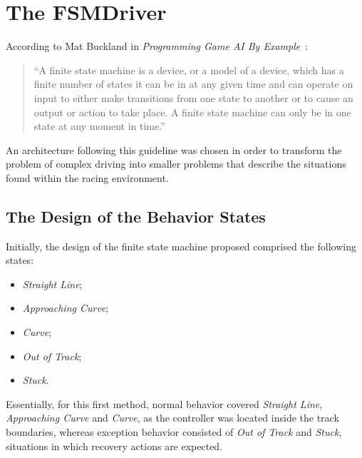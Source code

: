 \section{\textbf{The FSMDriver}} \label{sec:FSM}
	
	According to Mat Buckland in \emph{Programming Game AI By Example}~\cite{Buckland:2005:AI}:
	
	\begin{quotation} \itshape
		
		``A finite state machine is a device, or a model of a device, which has a finite number of states it can be in at any given time and can operate on input to either make transitions from one state to another or to cause an output or action to take place. A finite state machine can only be in one state at any moment in time.''
		
	\end{quotation}
	
	An architecture following this guideline was chosen in order to transform the problem of complex driving into smaller problems that describe the situations found within the racing environment.
	
\subsection{The Design of the Behavior States}
	
	Initially, the design of the finite state machine proposed comprised the following states:
	
	\begin{itemize}

	\item \emph{Straight Line};
	
	\item \emph{Approaching Curve};
	
	\item \emph{Curve};
	
	\item \emph{Out of Track};
	
	\item \emph{Stuck}.

	\end{itemize}
	
	Essentially, for this first method, normal behavior covered \emph{Straight Line}, \emph{Approaching Curve} and \emph{Curve}, as the controller was located inside the track boundaries, whereas exception behavior consisted of \emph{Out of Track} and \emph{Stuck}, situations in which recovery actions are expected.
	
